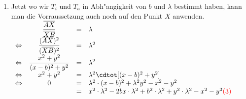 \begin{\small}
\begin{Beweis}
\begin{enumerate}
  \item
  Jetzt wo wir $T_{i}$ und $T_{a}$ in Abh"angigkeit von $b$ und $\lambda$ bestimmt haben, kann man die Vorraussetzung auch noch auf den Punkt $X$ anwenden.\\
  $\begin{array}{rccll}
                      & \dfrac{\overline{AX}}{\overline{XB}}        & = & \lambda \\
    \Leftrightarrow & \dfrac{(\overline{AX})^2}{(\overline{XB})^2}& = & \lambda^2 \\
    \Leftrightarrow & \dfrac{x^2+y^2}{(x-b)^2+y^2}                & = & \lambda^2 \\
    \Leftrightarrow & x^2+y^2                                     & = & \lambda^2 \cdtot [(x-b)^2+y^2] \\
    \Leftrightarrow & 0                                           & = & \lambda^2 \cdot (x-b)^2 +\lambda^2 y^2 -x^2 -y^2 \\
                      &                                               & = & x^2\cdot \lambda^2 - 2bx\cdot \lambda^2 +b^2\cdot \lambda^2 +y^2\cdot \lambda^2 -x^2-y^2  \textcolor{red}{(3)}
  \end{array}$



\end{enumerate}
\end{Beweis}
\end{\small}
